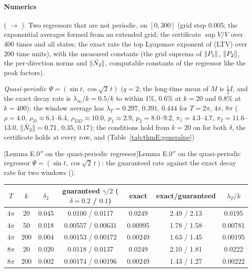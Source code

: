 \paragraph{Numerics} ( $\to$ ). Two regressors
that are not periodic, on $[0,300]$ (grid step $0.005$; the exponential averages formed from an extended grid; the
certificate $\sup\dot V/V$ over 400 times and all states; the exact rate the top Lyapunov exponent of \textup{(LTV)}
over 200 time units), with the measured constants (the grid suprema of $\lVert P_1\rVert$, $\lVert P_2\rVert$, the per-direction
norms and $\lVert \bar N_2\rVert$, computable constants of the regressor like the peak factors).

\smallskip
\noindent\emph{Quasi-periodic $\Psi=(\sin t,\cos\sqrt2\,t)$} ($q=2$; the long-time mean of $M$ is $\frac12I$, and
the exact decay rate is $\lambda_\infty/k=0.5/k$ to within 1\%, 0.6\% at $k=20$ and 0.8\% at $k=400$): the window
average has $\lambda_T=0.297$, $0.391$, $0.444$ for $T=2\pi$, $4\pi$, $8\pi$ ($\rho=4.0$, $\rho_D\approx6.1$--$6.4$,
$\rho_{DD}\approx10.0$, $p_1\approx2.9$, $p_2=8.0$--$9.2$, $\pi_1=4.3$--$4.7$, $\pi_2=11.6$--$13.0$,
$\lVert \bar N_2\rVert=0.71$, $0.35$, $0.17$); the conditions hold from $k=20$ on for both $\delta$, the certificate holds
at every row, and (Table~\ref{tab:thmE:generalpe})

\medskip
\noindent\begin{minipage}{\textwidth}
\centering\footnotesize
{}[Lemma E.0$''$ on the quasi-periodic regressor]{Lemma E.0$''$ on the quasi-periodic regressor
$\Psi=(\sin t,\cos\sqrt2\,t)$: the guaranteed rate against the exact decay rate for two windows
().}
\label{tab:thmE:generalpe}
\begin{tabular}{@{}ccccccc@{}}
\toprule
$T$ & $k$ & $\delta_2$ & guaranteed $\gamma/2$ ($\delta=0.2$ / $0.1$) & exact & exact/guaranteed & $\lambda_T/k$\\
\midrule
$4\pi$ & 20 & 0.045 & 0.0100 / 0.0117 & 0.0249 & 2.49 / 2.13 & 0.0195\\
$4\pi$ & 50 & 0.018 & 0.00557 / 0.00631 & 0.00995 & 1.78 / 1.58 & 0.00781\\
$4\pi$ & 200 & 0.004 & 0.00153 / 0.00172 & 0.00249 & 1.63 / 1.45 & 0.00195\\
$8\pi$ & 20 & 0.020 & 0.0118 / 0.0137 & 0.0249 & 2.10 / 1.81 & 0.0222\\
$8\pi$ & 200 & 0.002 & 0.00174 / 0.00196 & 0.00249 & 1.43 / 1.27 & 0.00222\\
\bottomrule
\end{tabular}
\end{minipage}
\medskip

